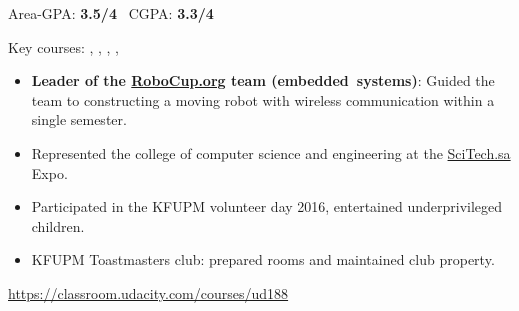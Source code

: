 

{}
\smallskip
Area-GPA: \textbf{3.5/4} \ CGPA: \textbf{3.3/4} \\
\smallskip
\begin{small}
Key courses: , , , , 
\end{small}

\smallskip
\begin{itemize}
    \item \textbf{Leader of the \href{https://www.robocup.org/}{RoboCup.org} team (embedded~systems)}: Guided the team to constructing a moving robot with wireless communication within a single semester.
    \item Represented the college of computer science and engineering at the \href{https://www.scitech.sa}{SciTech.sa} Expo.
    \item Participated in the KFUPM volunteer day 2016, entertained underprivileged children.
    \item KFUPM Toastmasters club: prepared rooms and maintained club property.
\end{itemize}



\divider

\href{https://classroom.udacity.com/courses/ud188}{https://classroom.udacity.com/courses/ud188}


